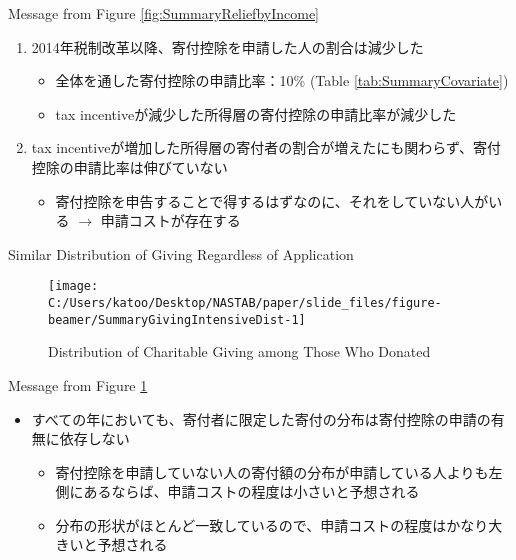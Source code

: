 \documentclass[
  ignorenonframetext,
  aspectratio=169,
]{beamer}
\providecommand{\tightlist}{%
  \setlength{\itemsep}{0pt}\setlength{\parskip}{0pt}}
\begin{document}
\begin{frame}{Message from Figure \ref{fig:SummaryReliefbyIncome}}
\protect\hypertarget{message-from-figure-reffigsummaryreliefbyincome}{}
\begin{enumerate}
\tightlist
\item
  2014年税制改革以降、寄付控除を申請した人の割合は減少した

  \begin{itemize}
  \tightlist
  \item
    全体を通した寄付控除の申請比率：10\% (Table \ref{tab:SummaryCovariate})
  \item
    tax incentiveが減少した所得層の寄付控除の申請比率が減少した
  \end{itemize}
\item
  tax incentiveが増加した所得層の寄付者の割合が増えたにも関わらず、寄付控除の申請比率は伸びていない

  \begin{itemize}
  \tightlist
  \item
    寄付控除を申告することで得するはずなのに、それをしていない人がいる \(\to\) 申請コストが存在する
  \end{itemize}
\end{enumerate}
\end{frame}

\begin{frame}{Similar Distribution of Giving Regardless of Application}
\protect\hypertarget{similar-distribution-of-giving-regardless-of-application}{}
\begin{figure}[t]

{\centering \texttt{[image: C:/Users/katoo/Desktop/NASTAB/paper/slide\_files/figure-beamer/SummaryGivingIntensiveDist-1]} 

}

\caption{Distribution of Charitable Giving among Those Who Donated}\label{fig:SummaryGivingIntensiveDist}
\end{figure}
\end{frame}

\begin{frame}{Message from Figure \ref{fig:SummaryGivingIntensiveDist}}
\protect\hypertarget{message-from-figure-reffigsummarygivingintensivedist}{}
\begin{itemize}
\tightlist
\item
  すべての年においても、寄付者に限定した寄付の分布は寄付控除の申請の有無に依存しない

  \begin{itemize}
  \tightlist
  \item
    寄付控除を申請していない人の寄付額の分布が申請している人よりも左側にあるならば、申請コストの程度は小さいと予想される
  \item
    分布の形状がほとんど一致しているので、申請コストの程度はかなり大きいと予想される
  \end{itemize}
\end{itemize}
\end{frame}
\end{document}
